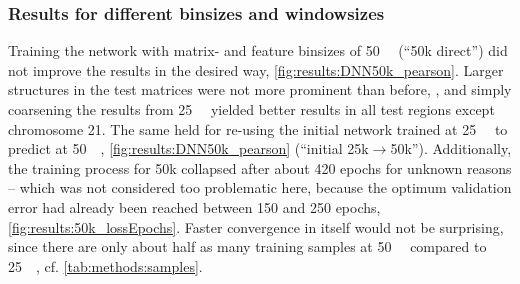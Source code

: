\subsubsection{Results for different binsizes and windowsizes} \label{sec:results:binsize_winsize}
Training the network with matrix- and feature binsizes of \SI{50}{\kilo\bp} (``50k direct'') did not improve the results in the desired way, \cref{fig:results:DNN50k_pearson}.
Larger structures in the test matrices were not more prominent than before, \xxx, 
and simply coarsening the results from \SI{25}{\kilo\bp} yielded better results in all test regions except chromosome 21.
The same held for re-using the initial network trained at \SI{25}{\kilo\bp} to predict at \SI{50}{\kilo\bp}, \cref{fig:results:DNN50k_pearson} (``initial 25k$\rightarrow$50k'').
Additionally, the training process for 50k collapsed after about 420 epochs for unknown reasons -- 
which was not considered too problematic here, because the optimum validation error had already been reached between 150 and 250 epochs, \cref{fig:results:50k_lossEpochs}. 
Faster convergence in itself would not be surprising, since there are only about half as many training samples at \SI{50}{\kilo\bp} compared to \SI{25}{\kilo\bp}, cf. \cref{tab:methods:samples}.
